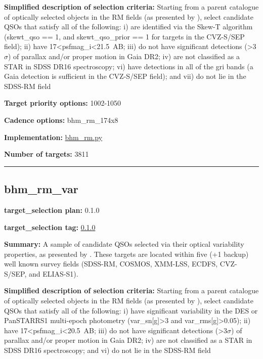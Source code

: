 \noindent\textbf{Simplified description of selection criteria:} Starting from a
parent catalogue of optically selected objects in the RM fields (as
presented by
\citealt{Yang2022}), select candidate QSOs that satisfy all of the
following: i) are identified via the Skew-T algorithm (skewt\_qso == 1,
and skewt\_qso\_prior == 1 for targets in the CVZ-S/SEP field); ii) have
17\textless psfmag\_i\textless21.5~AB; iii) do not have significant
detections (\textgreater3$\sigma$) of parallax and/or proper motion in Gaia
DR2; iv) are not classified as a STAR in SDSS DR16 spectroscopy; vi)
have detections in all of the gri bands (a Gaia detection is sufficient
in the CVZ-S/SEP field); and vii) do not lie in the SDSS-RM field


\noindent\textbf{Target priority options:} 1002-1050

\noindent\textbf{Cadence options:} bhm\_rm\_174x8

\noindent\textbf{Implementation:}
\href{https://github.com/sdss/target_selection/blob/0.1.0/python/target_selection/cartons/bhm_rm.py}{bhm\_rm.py}

\noindent\textbf{Number of targets:} 3811

\begin{center}\rule{0.5\linewidth}{0.5pt}\end{center}

\hypertarget{bhm_rm_var_plan0.1.0}{%
\subsection{bhm\_rm\_var}\label{bhm_rm_var_plan0.1.0}}

\noindent\textbf{target\_selection plan:} 0.1.0

\noindent\textbf{target\_selection tag:}
\href{https://github.com/sdss/target_selection/tree/0.1.0/}{0.1.0}

\noindent\textbf{Summary:} A sample of candidate QSOs selected via their optical
variability properties, as presented by
\citet{Yang2022}. These targets are located within five (+1 backup) well
known survey fields (SDSS-RM, COSMOS, XMM-LSS, ECDFS, CVZ-S/SEP, and
ELIAS-S1).

\noindent\textbf{Simplified description of selection criteria:} Starting from a
parent catalogue of optically selected objects in the RM fields (as
presented by
\citealt{Yang2022}), select candidate QSOs that satisfy all of the
following: i) have significant variability in the DES or PanSTARRS1
multi-epoch photometry (var\_sn{[}g{]}\textgreater3 and
var\_rms{[}g{]}\textgreater0.05); ii) have
17\textless psfmag\_i\textless20.5~AB; iii) do not have significant
detections (\textgreater3$\sigma$) of parallax and/or proper motion in Gaia
DR2; iv) are not classified as a STAR in SDSS DR16 spectroscopy; and vi)
do not lie in the SDSS-RM field


